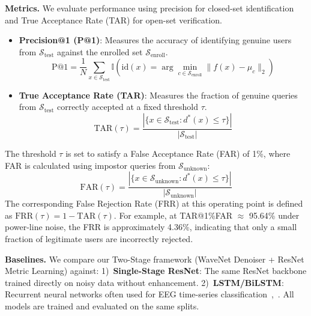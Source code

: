 \documentclass[conference]{IEEEtran}
\begin{document}
\textbf{Metrics.} We evaluate performance using precision for closed-set identification and True Acceptance Rate (TAR) for open-set verification.
\begin{itemize}
    \item \textbf{Precision@1 (P@1)}: Measures the accuracy of identifying genuine users from $\mathcal{S}_{\text{test}}$ against the enrolled set $\mathcal{S}_{\text{enroll}}$.
    \begin{equation}
        \text{P@1} = \frac{1}{N} \sum_{x \in \mathcal{S}_{\text{test}}} \mathbb{I}(\text{id}(x) = \arg\min_{c \in \mathcal{S}_{\text{enroll}}} \|f(x) - \mu_c\|_2)
    \end{equation}
    \item \textbf{True Acceptance Rate (TAR)}: Measures the fraction of genuine queries from $\mathcal{S}_{\text{test}}$ correctly accepted at a fixed threshold $\tau$.
    \begin{equation}
        \text{TAR}(\tau) = \frac{|\{x \in \mathcal{S}_{\text{test}} : d^*(x) \leq \tau\}|}{|\mathcal{S}_{\text{test}}|}
    \end{equation}
\end{itemize}

The threshold $\tau$ is set to satisfy a False Acceptance Rate (FAR) of 1\%, where FAR is calculated using impostor queries from $\mathcal{S}_{\text{unknown}}$:
\begin{equation}
    \text{FAR}(\tau) = \frac{|\{x \in \mathcal{S}_{\text{unknown}} : d^*(x) \leq \tau\}|}{|\mathcal{S}_{\text{unknown}}|}
\end{equation}
The corresponding False Rejection Rate (FRR) at this operating point is defined as $\text{FRR}(\tau) = 1 - \text{TAR}(\tau)$. For example, at TAR@1\%FAR $\approx$ 95.64\% under power-line noise, the FRR is approximately 4.36\%, indicating that only a small fraction of legitimate users are incorrectly rejected.

\textbf{Baselines.} We compare our Two-Stage framework (WaveNet Denoiser + ResNet Metric Learning) against: 1)~\textbf{Single-Stage ResNet}: The same ResNet backbone trained directly on noisy data without enhancement. 2)~\textbf{LSTM/BiLSTM}: Recurrent neural networks often used for EEG time-series classification~\cite{b9},~\cite{b10}. All models are trained and evaluated on the same splits.

\end{document}

